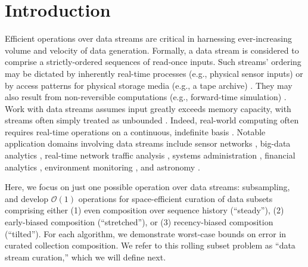 \section{Introduction} \label{sec:introduction}

Efficient operations over data streams are critical in harnessing ever-increasing volume and velocity of data generation.
Formally, a data stream is considered to comprise a strictly-ordered sequences of read-once inputs.
Such streams' ordering may be dictated by inherently real-time processes (e.g., physical sensor inputs) or by access patterns for physical storage media (e.g., a tape archive) \citep{henzinger1998computing}.
They may also result from non-reversible computations (e.g., forward-time simulation) \citep{abdulla2004simulation,schutzel2014stream}.
Work with data streams assumes input greatly exceeds memory capacity, with streams often simply treated as unbounded \citep{jiang2006research}.
Indeed, real-world computing often requires real-time operations on a continuous, indefinite basis \citep{cordeiro2016online}.
Notable application domains involving data streams include sensor networks \citep{elnahrawy2003research}, big-data analytics \citep{he2010comet}, real-time network traffic analysis \citep{johnson2005streams,muthukrishnan2005data}, systems administration \citep{fischer2012real}, financial analytics \citep{rajeshwari2016real,agarwal2009faster}, environment monitoring \citep{hill2009real}, and astronomy \citep{graham2012data}.

Here, we focus on just one possible operation over data streams: subsampling, and develop $\mathcal{O}(1)$ operations for space-efficient curation of data subsets comprising either (1) even composition over sequence history (``steady''), (2) early-biased composition (``stretched''), or (3) recency-biased composition (``tilted'').
For each algorithm, we demonstrate worst-case bounds on error in curated collection composition.
We refer to this rolling subset problem as ``data stream curation,'' which we will define next.






